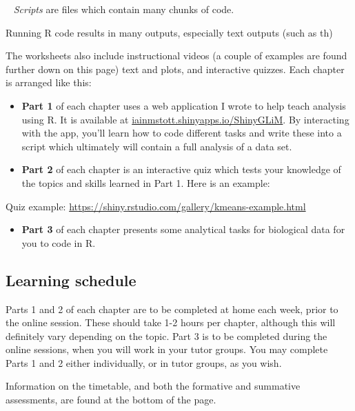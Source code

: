 \documentclass[
]{book}
\providecommand{\tightlist}{%
  \setlength{\itemsep}{0pt}\setlength{\parskip}{0pt}}
\begin{document}
~
\emph{Scripts} are files which contain many chunks of code.

Running R code results in many outputs, especially text outputs (such as th)

The worksheets also include instructional videos (a couple of examples are
found further down on this page) text and plots, and interactive
quizzes. Each chapter is arranged like this:

\begin{itemize}
\tightlist
\item
  \textbf{Part 1} of each chapter uses a web application I wrote to help teach analysis
  using R. It is available at
  \url{iainmstott.shinyapps.io/ShinyGLiM}.
  By interacting with the app, you'll learn how to code different tasks and
  write these into a script which ultimately will contain a full analysis of a
  data set.
\item
  \textbf{Part 2} of each chapter is an interactive quiz which tests your knowledge of the
  topics and skills learned in Part 1. Here is an example:
\end{itemize}

Quiz example: \url{https://shiny.rstudio.com/gallery/kmeans-example.html}
~

\begin{itemize}
\tightlist
\item
  \textbf{Part 3} of each chapter presents some analytical tasks for biological data
  for you to code in R.\\
  \hspace*{0.333em}
\end{itemize}

\hypertarget{learning-schedule}{%
\subsection{Learning schedule}\label{learning-schedule}}

Parts 1 and 2 of each chapter are to be completed at home each week, prior to the
online session. These should take 1-2 hours per chapter, although this will
definitely vary depending on the topic. Part 3 is to be
completed during the online sessions, when you will work in your tutor groups.
You may complete Parts 1 and 2 either individually, or in tutor groups, as you wish.

Information on the timetable, and both the formative and summative assessments,
are found at the bottom of the page.\\
\hspace*{0.333em}
\end{document}
